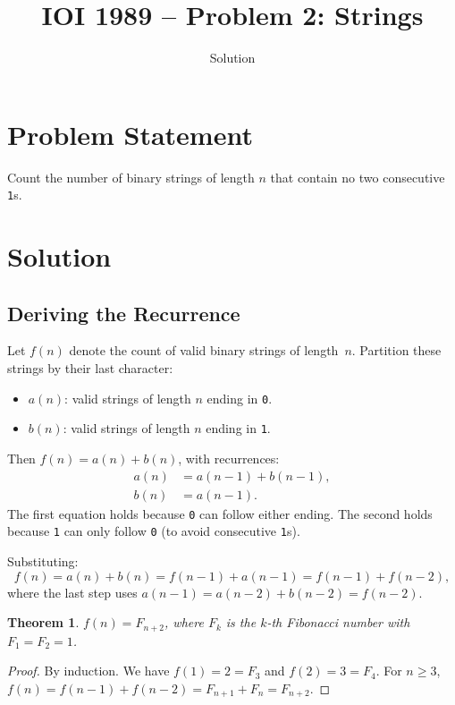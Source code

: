 \documentclass[11pt,a4paper]{article}
\title{IOI 1989 -- Problem 2: Strings}
\author{Solution}
\date{}
\newtheorem{theorem}{Theorem}
\begin{document}
\maketitle

\section{Problem Statement}

Count the number of binary strings of length $n$ that contain no two
consecutive \texttt{1}s.

\section{Solution}

\subsection{Deriving the Recurrence}

Let $f(n)$ denote the count of valid binary strings of length~$n$. Partition
these strings by their last character:
\begin{itemize}
  \item $a(n)$: valid strings of length $n$ ending in \texttt{0}.
  \item $b(n)$: valid strings of length $n$ ending in \texttt{1}.
\end{itemize}

Then $f(n) = a(n) + b(n)$, with recurrences:
\begin{align}
  a(n) &= a(n-1) + b(n-1), \\
  b(n) &= a(n-1).
\end{align}
The first equation holds because \texttt{0} can follow either ending. The
second holds because \texttt{1} can only follow \texttt{0} (to avoid
consecutive \texttt{1}s).

Substituting:
\[
  f(n) = a(n) + b(n) = f(n-1) + a(n-1) = f(n-1) + f(n-2),
\]
where the last step uses $a(n-1) = a(n-2) + b(n-2) = f(n-2)$.

\begin{theorem}
$f(n) = F_{n+2}$, where $F_k$ is the $k$-th Fibonacci number with
$F_1 = F_2 = 1$.
\end{theorem}
\begin{proof}
By induction. We have $f(1) = 2 = F_3$ and $f(2) = 3 = F_4$. For $n \ge 3$,
$f(n) = f(n-1) + f(n-2) = F_{n+1} + F_n = F_{n+2}$.
\end{proof}
\end{document}
